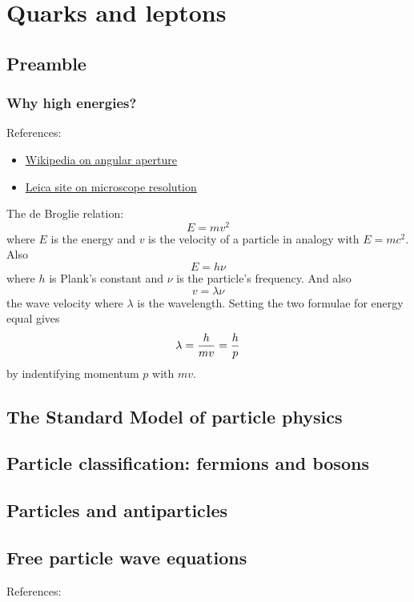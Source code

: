 \documentclass{book}
\begin{document}
\chapter{Quarks and leptons}

\section{Preamble}

\subsection{Why high energies?}

References:

\begin{itemize}
\item \href{https://en.wikipedia.org/wiki/Angular\_aperture}{Wikipedia on angular aperture}
\item \href{https://www.leica-microsystems.com/science-lab/life-science/microscope-resolution-concepts-factors-and-calculation/}{Leica site on microscope resolution}
\end{itemize}

The de Broglie relation:
$$
E = mv^2
$$
where $E$ is the energy and $v$ is the velocity of a particle in analogy with $E=mc^2$. Also
$$
E = h\nu
$$
where $h$ is Plank's constant and $\nu$ is the particle's frequency. And also
$$
v = \lambda\nu
$$
the wave velocity where $\lambda$ is the wavelength. Setting the two formulae for energy equal gives
$$
\lambda = {h \over mv} = {h \over p}
$$
by indentifying momentum $p$ with $mv$.

\section{The Standard Model of particle physics}
\section{Particle classification: fermions and bosons}
\section{Particles and antiparticles}
\section{Free particle wave equations}

References:
\end{document}
